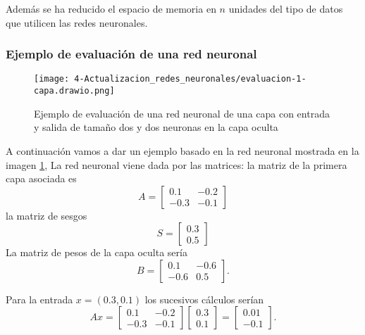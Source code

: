 Además se ha reducido el espacio de memoria en $n$ unidades del tipo de datos que utilicen las redes neuronales. 

\subsubsection*{Ejemplo de evaluación de una red neuronal}

\begin{figure}[h!]
    \texttt{[image: 4-Actualizacion\_redes\_neuronales/evaluacion-1-capa.drawio.png]}
    \centering
    \caption{Ejemplo de evaluación de una red neuronal de una capa con entrada y salida de tamaño dos y dos neuronas en la capa oculta}
    \label{img:Ejemplo-evaluación-red-neruonal-una-capa}
\end{figure}

A continuación vamos a dar un ejemplo basado en la red neuronal mostrada en la imagen \ref{img:Ejemplo-evaluación-red-neruonal-una-capa}, 
La red neuronal viene dada por las matrices: 
la matriz de la primera capa asociada es 
\begin{equation}
     A = 
        \begin{bmatrix}
            0.1 & -0.2 \\
            -0.3 & -0.1 
        \end{bmatrix}  
\end{equation}
la matriz de sesgos 
\begin{equation}
    S = 
        \begin{bmatrix}
            0.3  \\
            0.5 
        \end{bmatrix}  
\end{equation}
La matriz de pesos de la capa oculta sería 
\begin{equation}
     B = 
    \begin{bmatrix}
        0.1 & -0.6 \\
        -0.6 & 0.5
    \end{bmatrix}. 
\end{equation}

Para la entrada  $x = (0.3, 0.1)$ los sucesivos cálculos serían
\begin{equation}
    A x = 
    \begin{bmatrix}
        0.1 & -0.2 \\
        -0.3 & -0.1 
    \end{bmatrix}  
    \begin{bmatrix}
        0.3  \\
        0.1 
    \end{bmatrix}
    = 
    \begin{bmatrix}
        0.01  \\
        -0.1 
    \end{bmatrix}
    . 
\end{equation}

